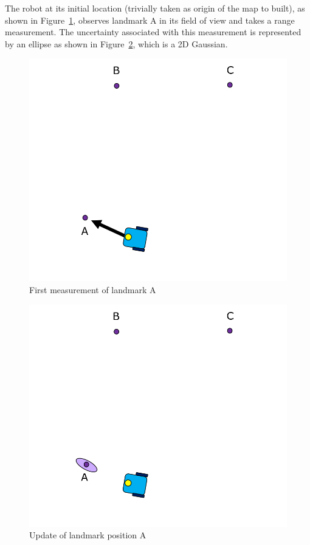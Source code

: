 \begin{exmp}
The robot at its initial location (trivially taken as origin of the map to built), as shown in Figure~\ref{slam_example2}, observes landmark A in its field of view and takes a range measurement. The uncertainty associated with this measurement is represented by an ellipse as shown in Figure~\ref{slam_example3}, which is a 2D Gaussian. 
\begin{figure}
\centering
\includegraphics[scale=0.3]{./images/slam_example2}
\caption{First measurement of landmark A}
\label{slam_example2}
\end{figure}
\begin{figure}
\centering
\includegraphics[scale=0.3]{./images/slam_example3}
\caption{Update of landmark position A}
\label{slam_example3}
\end{figure}


\end{exmp}
